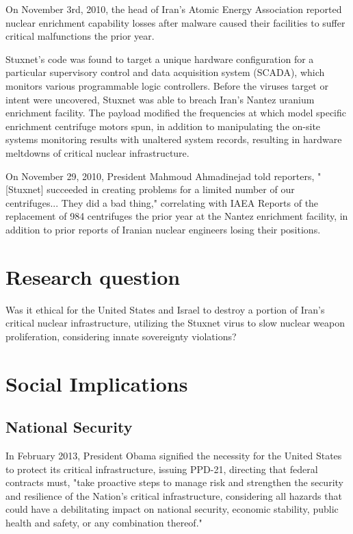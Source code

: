 \documentclass[12pt]{article}
\begin{document}
\begin{multicols}{2}
On November 3rd, 2010, the head of Iran's Atomic Energy Association reported nuclear enrichment capability losses after malware caused their facilities to suffer critical malfunctions the prior year.\cite{didStuxnetTakeOut1000Centrifuges} 

Stuxnet's code was found to target a unique hardware configuration for a particular supervisory control and data acquisition system (SCADA), which monitors various programmable logic controllers. Before the viruses target or intent were uncovered, Stuxnet was able to breach Iran's Nantez uranium enrichment facility. The payload modified the frequencies at which model specific enrichment centrifuge motors spun, in addition to manipulating the on-site systems monitoring results with unaltered system records, resulting in hardware meltdowns of critical nuclear infrastructure.\cite{w32.stuxnetDossier}\cite{lessonsFromStuxnet}

On November 29, 2010, President Mahmoud Ahmadinejad told reporters, "[Stuxnet] succeeded in creating problems for a limited number of our centrifuges... They did a bad thing," correlating with IAEA Reports of the replacement of 984 centrifuges the prior year at the Nantez enrichment facility, in addition to prior reports of Iranian nuclear engineers losing their positions.\cite{didStuxnetTakeOut1000Centrifuges}


\section{Research question}

Was it ethical for the United States and Israel to destroy a portion of Iran's critical nuclear infrastructure, utilizing the Stuxnet virus to slow nuclear weapon proliferation, considering innate sovereignty violations?


\section{Social Implications}

\subsection{National Security}

In February 2013, President Obama signified the necessity for the United States to protect its critical infrastructure, issuing PPD-21, directing that federal contracts must, "take proactive steps to manage risk and strengthen the security and resilience of the Nation’s critical infrastructure, considering all hazards that could have a debilitating impact on national security, economic stability, public health and safety, or any combination thereof."\cite{industrialCyberVulnerabilities} 


\end{multicols}
\end{document}
